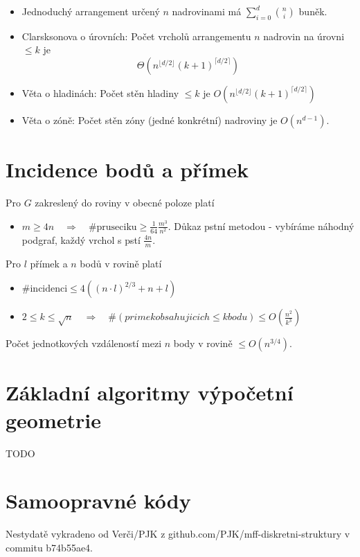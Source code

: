 \documentclass[a4paper,10pt,titlepage]{article} \usepackage[utf8]{inputenc}
\begin{document}
\begin{itemize}
\item Jednoduchý arrangement určený $n$ nadrovinami má $\sum\limits_{i=0}^d {n \choose i}$
buněk.
\item Clarsksonova o úrovních: Počet vrcholů arrangementu $n$ nadrovin na úrovni $\leq k$
je $$\Theta(n^{\lfloor d/2 \rfloor} (k+1)^{\lceil d/2 \rceil})$$
\item Věta o hladinách: Počet stěn hladiny $\leq k$ je \quad
$O(n^{\lfloor d/2 \rfloor} (k+1)^{\lceil d/2 \rceil})$
\item Věta o zóně: Počet stěn zóny (jedné konkrétní) nadroviny je $O(n^{d-1})$.
\end{itemize}

\section{Incidence bodů a přímek}
Pro $G$ zakreslený do roviny v obecné poloze platí
\begin{itemize}
\item $m \geq 4n \quad \Rightarrow \quad \text{\#pruseciku} \geq \frac{1}{64}\frac{m^3}{n^2}$.
\quad Důkaz pstní metodou - vybíráme náhodný podgraf, každý vrchol s pstí $\frac{4n}{m}$.

\end{itemize}

\noindent Pro $l$ přímek a $n$ bodů v rovině platí
\begin{itemize}
\item $\text{\#incidenci} \leq 4((n\cdot l)^{2/3} + n + l)$
\item $2 \leq k \leq \sqrt{n} \quad \Rightarrow \quad \#(primek obsahujicich \leq k bodu) \leq O(\frac{n^2}{k^3})$
\end{itemize}

\noindent Počet jednotkových vzdáleností mezi $n$ body v rovině $\leq O(n^{3/4}).$

\section{Základní algoritmy výpočetní geometrie}
TODO

\def\vykradeno{Nestydatě vykradeno od Verči/PJK z
github.com/PJK/mff-diskretni-struktury v commitu b74b55ae4.}

\section{Samoopravné kódy}
\vykradeno
\end{document}
